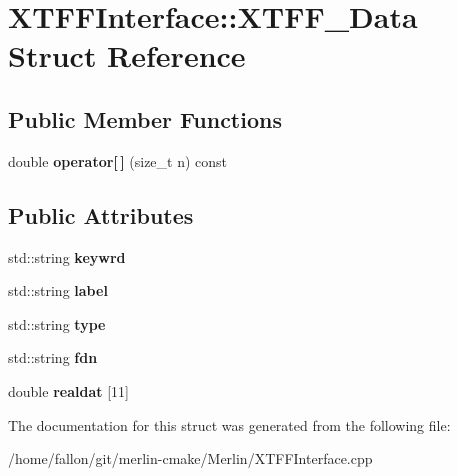 \hypertarget{structXTFFInterface_1_1XTFF__Data}{}\section{X\+T\+F\+F\+Interface\+:\+:X\+T\+F\+F\+\_\+\+Data Struct Reference}
\label{structXTFFInterface_1_1XTFF__Data}
\subsection*{Public Member Functions}
\begin{DoxyCompactItemize}
\item 
\mbox{\label{structXTFFInterface_1_1XTFF__Data_a2d990db9d6fe3d51479417a0b2504632}} 
double {\bfseries operator\mbox{[}$\,$\mbox{]}} (size\+\_\+t n) const
\end{DoxyCompactItemize}
\subsection*{Public Attributes}
\begin{DoxyCompactItemize}
\item 
\mbox{\label{structXTFFInterface_1_1XTFF__Data_adeb40e01c6aef5141e0774b387dae66e}} 
std\+::string {\bfseries keywrd}
\item 
\mbox{\label{structXTFFInterface_1_1XTFF__Data_a3507d1df0b7c7208a6d8441ae94dd73e}} 
std\+::string {\bfseries label}
\item 
\mbox{\label{structXTFFInterface_1_1XTFF__Data_a8b5ff18bd32ad47326c779612eddfe16}} 
std\+::string {\bfseries type}
\item 
\mbox{\label{structXTFFInterface_1_1XTFF__Data_aecd68f86274c02f04c20709dcefd0581}} 
std\+::string {\bfseries fdn}
\item 
\mbox{\label{structXTFFInterface_1_1XTFF__Data_a0ca100149a14c717db4b3bffad4f8a27}} 
double {\bfseries realdat} \mbox{[}11\mbox{]}
\end{DoxyCompactItemize}


The documentation for this struct was generated from the following file\+:\begin{DoxyCompactItemize}
\item 
/home/fallon/git/merlin-\/cmake/\+Merlin/X\+T\+F\+F\+Interface.\+cpp\end{DoxyCompactItemize}
